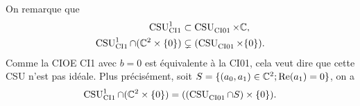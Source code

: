     On remarque que
    \begin{align}
      \CSU[1]{CI1} &\subset \CSU{CI01}\times\CC,
      \\
      \CSU[1]{CI1}\cap(\CC^2 \times \lbrace0\rbrace) &\subsetneq (\CSU{CI01}\times\lbrace0\rbrace).
    \end{align}
      Comme la CIOE CI1 avec \(b=0\) est équivalente à la CI01, cela veut dire que cette CSU n'est pas idéale. 
      Plus précisément, soit \(S = \lbrace (a_0,a_1) \in \CC^2; \Re(a_1)=0 \rbrace\), on a
    \begin{equation}
      \CSU[1]{CI1}\cap(\CC^2 \times \lbrace0\rbrace) = ((\CSU{CI01}\cap S) \times\lbrace0\rbrace). 
    \end{equation}


